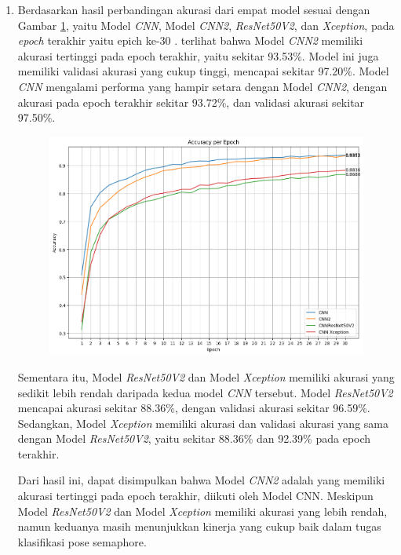 \begin{enumerate}[nolistsep]
\item Berdasarkan hasil perbandingan akurasi dari empat model sesuai dengan Gambar \ref{fig:GrafikPerbandinganAkurasi}, yaitu Model \textit{CNN}, Model \textit{CNN2}, \textit{ResNet50V2}, dan \textit{Xception}, pada \textit{epoch} terakhir yaitu epich ke-30 . terlihat bahwa Model \textit{CNN2} memiliki akurasi tertinggi pada epoch terakhir, yaitu sekitar 93.53\%. Model ini juga memiliki validasi akurasi yang cukup tinggi, mencapai sekitar 97.20\%. Model \textit{CNN} mengalami performa yang hampir setara dengan Model \textit{CNN2}, dengan akurasi pada epoch terakhir sekitar 93.72\%, dan validasi akurasi sekitar 97.50\%.
\begin{figure}[!hbt]
	\centering
	\includegraphics[width=0.7\linewidth]{gambar/bener/Perbandingan_AkurasiCNN.png}
	\label{fig:GrafikPerbandinganAkurasi}
\end{figure}
Sementara itu, Model \textit{ResNet50V2} dan Model \textit{Xception} memiliki akurasi yang sedikit lebih rendah daripada kedua model \textit{CNN} tersebut. Model \textit{ResNet50V2} mencapai akurasi sekitar 88.36\%, dengan validasi akurasi sekitar 96.59\%. Sedangkan, Model \textit{Xception} memiliki akurasi dan validasi akurasi yang sama dengan Model \textit{ResNet50V2}, yaitu sekitar 88.36\% dan 92.39\% pada epoch terakhir.

Dari hasil ini, dapat disimpulkan bahwa Model \textit{CNN2} adalah yang memiliki akurasi tertinggi pada epoch terakhir, diikuti oleh Model CNN. Meskipun Model \textit{ResNet50V2} dan Model \textit{Xception} memiliki akurasi yang lebih rendah, namun keduanya masih menunjukkan kinerja yang cukup baik dalam tugas klasifikasi pose semaphore.


\end{enumerate}
